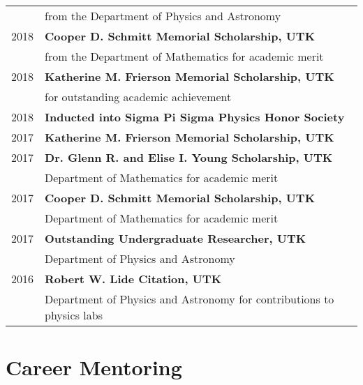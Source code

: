 \documentclass[letterpaper]{deedy-resume} %
\begin{document}
\begin{minipage}[t]{0.63\textwidth}
\begin{tabular}{rl}
          &  from the Department of Physics and Astronomy \\
  2018 & \textbf{Cooper D. Schmitt Memorial Scholarship, UTK}\\
          & from the Department of Mathematics for academic merit \\
  2018 & \textbf{Katherine M. Frierson Memorial Scholarship, UTK}\\
          & for outstanding academic achievement \\
  2018 & \textbf{Inducted into Sigma Pi Sigma Physics Honor Society} \\
  2017 & \textbf{Katherine M. Frierson Memorial Scholarship, UTK} \\
  2017 & \textbf{Dr. Glenn R. and Elise I. Young Scholarship, UTK}\\
          & Department of Mathematics for academic merit \\
  2017 & \textbf{Cooper D. Schmitt Memorial Scholarship, UTK}\\
          & Department of Mathematics for academic merit \\
  2017 & \textbf{Outstanding Undergraduate Researcher, UTK}\\
          & Department of Physics and Astronomy \\
  2016 & \textbf{Robert W. Lide Citation, UTK}\\
          & Department of Physics and Astronomy for contributions to physics labs  \\
\end{tabular}

\sectionspace %



\end{minipage} %
\clearpage


\section{Career Mentoring}
\end{document}
